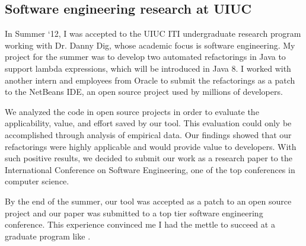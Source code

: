 \subsection{Software engineering research at UIUC}
In Summer ‘12, I was accepted to the UIUC ITI undergraduate research program working with Dr. Danny Dig, whose academic focus is software engineering. 
My project for the summer was to develop two automated refactorings in Java to support lambda expressions, which will be introduced in Java 8. 
I worked with another intern and employees from Oracle to submit the refactorings as a patch to the NetBeans IDE, an open source project used by millions of developers. 

We analyzed the code in open source projects in order to evaluate the applicability, value, and effort saved by our tool. 
This evaluation could only be accomplished through analysis of empirical data. 
Our findings showed that our refactorings were highly applicable and would provide value to developers. 
With such positive results, we decided to submit our work as a research paper to the International Conference on Software Engineering, one of the top conferences in computer science. 

By the end of the summer, our tool was accepted as a patch to an open source project and our paper was submitted to a top tier software engineering conference. 
This experience convinced me I had the mettle to succeed at a graduate program like \schoolShort.